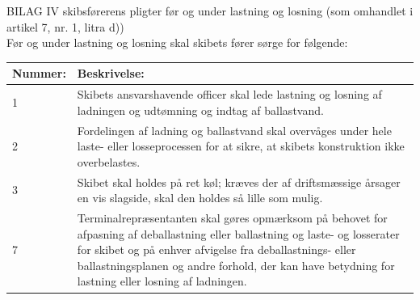 BILAG IV skibsførerens pligter før og under lastning og losning (som omhandlet i artikel 7, nr. 1, litra d)) \\
Før og under lastning og losning skal skibets fører sørge for følgende:\\
\begin{table}[H]
\begin{tabular}{|p{1.5cm}|p{12cm}|} \hline
\cellcolor[gray]{0.85}Nummer: & \cellcolor[gray]{0.85}Beskrivelse:  \\ \hline
1 & Skibets ansvarshavende officer skal lede lastning og losning af ladningen og udtømning og indtag af ballastvand. \\ \hline
2 & Fordelingen af ladning og ballastvand skal overvåges under hele laste- eller losseprocessen for at sikre, at skibets konstruktion ikke overbelastes. \\ \hline
3 & Skibet skal holdes på ret køl; kræves der af driftsmæssige årsager en vis slagside, skal den holdes så lille som mulig. \\ \hline
7 & Terminalrepræsentanten skal gøres opmærksom på behovet for afpasning af deballastning eller ballastning og laste- og losserater for skibet og på enhver afvigelse fra deballastnings- eller ballastningsplanen og andre forhold, der kan have betydning for lastning eller losning af ladningen. \\ \hline
\end{tabular}
\end{table}

